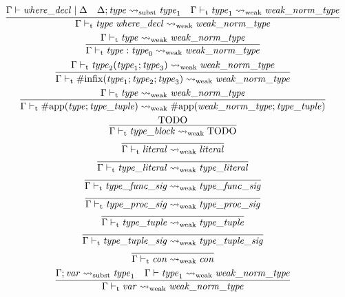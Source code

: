 \begin{gather*}
    \infer{\Gamma \vdash_\mathrm{t} \mathit{type}\; \mathit{where\_decl} \rightsquigarrow_\mathrm{weak} \mathit{weak\_norm\_type}}{
        \Gamma \vdash \mathit{where\_decl} \mid \Delta
        &
        \Delta; \mathit{type} \rightsquigarrow_\mathrm{subst} \mathit{type}_1
        &
        \Gamma \vdash_\mathrm{t} \mathit{type}_1 \rightsquigarrow_\mathrm{weak} \mathit{weak\_norm\_type}
    }
    \\
    \infer{\Gamma \vdash_\mathrm{t} \mathit{type}: \mathit{type}_0 \rightsquigarrow_\mathrm{weak} \mathit{weak\_norm\_type}}{
        \Gamma \vdash_\mathrm{t} \mathit{type} \rightsquigarrow_\mathrm{weak} \mathit{weak\_norm\_type}
    }
    \\
    \infer{\Gamma \vdash_\mathrm{t} \mathrm{\#infix}(\mathit{type}_1; \mathit{type}_2; \mathit{type}_3) \rightsquigarrow_\mathrm{weak} \mathit{weak\_norm\_type}}{
        \Gamma \vdash_\mathrm{t} \mathit{type}_2(\mathit{type}_1; \mathit{type}_3) \rightsquigarrow_\mathrm{weak} \mathit{weak\_norm\_type}
    }
    \\
    \infer{\Gamma \vdash_\mathrm{t} \mathrm{\#app}(\mathit{type}; \mathit{type\_tuple}) \rightsquigarrow_\mathrm{weak} \mathrm{\#app}(\mathit{weak\_norm\_type}; \mathit{type\_tuple})}{
        \Gamma \vdash_\mathrm{t} \mathit{type} \rightsquigarrow_\mathrm{weak} \mathit{weak\_norm\_type}
    }
    \\
    \infer{\Gamma \vdash_\mathrm{t} \mathit{type\_block} \rightsquigarrow_\mathrm{weak} \text{TODO}}{
        \text{TODO}
    }
    \\
    \infer{\Gamma \vdash_\mathrm{t} \mathit{literal} \rightsquigarrow_\mathrm{weak} \mathit{literal}}{}
    \\
    \infer{\Gamma \vdash_\mathrm{t} \mathit{type\_literal} \rightsquigarrow_\mathrm{weak} \mathit{type\_literal}}{}
    \\
    \infer{\Gamma \vdash_\mathrm{t} \mathit{type\_func\_sig} \rightsquigarrow_\mathrm{weak} \mathit{type\_func\_sig}}{}
    \\
    \infer{\Gamma \vdash_\mathrm{t} \mathit{type\_proc\_sig} \rightsquigarrow_\mathrm{weak} \mathit{type\_proc\_sig}}{}
    \\
    \infer{\Gamma \vdash_\mathrm{t} \mathit{type\_tuple} \rightsquigarrow_\mathrm{weak} \mathit{type\_tuple}}{}
    \\
    \infer{\Gamma \vdash_\mathrm{t} \mathit{type\_tuple\_sig} \rightsquigarrow_\mathrm{weak} \mathit{type\_tuple\_sig}}{}
    \\
    \infer{\Gamma \vdash_\mathrm{t} \mathit{con} \rightsquigarrow_\mathrm{weak} \mathit{con}}{}
    \\
    \infer{\Gamma \vdash_\mathrm{t} \mathit{var} \rightsquigarrow_\mathrm{weak} \mathit{weak\_norm\_type}}{
        \Gamma; \mathit{var} \rightsquigarrow_\mathrm{subst} \mathit{type}_1
        &
        \Gamma \vdash \mathit{type}_1 \rightsquigarrow_\mathrm{weak} \mathit{weak\_norm\_type}
    }
\end{gather*}

